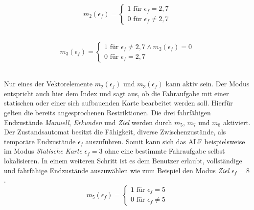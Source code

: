 		\begin{figure}[H]
			\centering
			\begin{minipage}[b]{0.4\textwidth}
				\begin{equation}
					m_2(\epsilon_f)=\left\{\begin{array}{ll} 1 \text{ für } \epsilon_f=2,7 \\
					0 \text{ für }\epsilon_f\neq 2,7\end{array}\right. 
					\label{eq: m2}
				\end{equation}\\
			\end{minipage}
			\hfill
			\begin{minipage}[b]{0.55\textwidth}
				\begin{equation}
					m_3(\epsilon_f)=\left\{\begin{array}{ll} 1 \text{ für } \epsilon_f\neq2,7 \wedge m_2(\epsilon_f) = 0 \\
					0 \text{ für }\epsilon_f= 2,7\end{array}\right.
					\label{eq: m3}
				\end{equation}\\
			\end{minipage}
		\end{figure}
		
		Nur eines der Vektorelemente $m_2(\epsilon_f)$ und $m_3(\epsilon_f)$ kann aktiv sein. Der Modus entspricht auch hier dem Index und sagt aus, ob die Fahraufgabe mit einer statischen oder einer sich aufbauenden Karte bearbeitet werden soll. Hierfür gelten die bereits angesprochenen Restriktionen. Die drei fahrfähigen Endzustände \textit{Manuell}, \textit{Erkunden} und \textit{Ziel} werden durch $m_5$, $m_7$ und $m_8$ aktiviert. Der Zustandsautomat besitzt die Fähigkeit, diverse Zwischenzustände, als temporäre Endzustände $\epsilon_f$ auszuführen. Somit kann sich das ALF beispielsweise im Modus \textit{Statische Karte} $\epsilon_f=3$ ohne eine bestimmte Fahraufgabe selbst lokalisieren. In einem weiteren Schritt ist es dem Benutzer erlaubt, vollständige und fahrfähige Endzustände auszuwählen wie zum Beispiel den Modus \textit{Ziel} $\epsilon_f=8$.\\
		
		
				\begin{equation}
					m_5(\epsilon_f)=\left\{\begin{array}{ll} 1 \text{ für } \epsilon_f=5 \\
						0 \text{ für }\epsilon_f\neq 5\end{array}\right. 
					\label{eq: m5}
				\end{equation}\\
			
